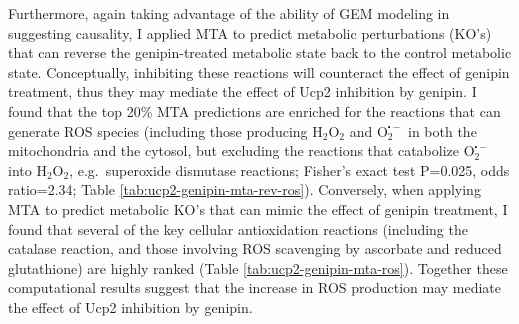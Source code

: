 \documentclass[12pt,twoside,openany,\mydriver]{thesis}  %
\begin{document}
Furthermore, again taking advantage of the ability of GEM modeling in suggesting causality, I applied MTA to predict metabolic perturbations (KO's) that can reverse the genipin-treated metabolic state back to the control metabolic state. Conceptually, inhibiting these reactions will counteract the effect of genipin treatment, thus they may mediate the effect of Ucp2 inhibition by genipin. I found that the top 20\% MTA predictions are enriched for the reactions that can generate ROS species (including those producing \(\mathrm{H_2O_2}\) and \(\mathrm{O_2^{\centerdot -}}\) in both the mitochondria and the cytosol, but excluding the reactions that catabolize \(\mathrm{O_2^{\centerdot -}}\) into \(\mathrm{H_2O_2}\), e.g.~superoxide dismutase reactions; Fisher's exact test P=0.025, odds ratio=2.34; Table \ref{tab:ucp2-genipin-mta-rev-ros}). Conversely, when applying MTA to predict metabolic KO's that can mimic the effect of genipin treatment, I found that several of the key cellular antioxidation reactions (including the catalase reaction, and those involving ROS scavenging by ascorbate and reduced glutathione) are highly ranked (Table \ref{tab:ucp2-genipin-mta-ros}). Together these computational results suggest that the increase in ROS production may mediate the effect of Ucp2 inhibition by genipin.
\begin{table}

\caption{\label{tab:ucp2-genipin-mta-rev-ros}Enrichment of top MTA predictions whose KO can reverse the effect of genipin in ROS producing reactions}
\centering
{}
\end{table}
\begin{table}

\caption{\label{tab:ucp2-genipin-mta-ros}The predicted percent rank of several cellular antioxidation reaction in the MTA prediction of reactions whose KO can mimic the effect of genipin treatment}
\centering
{}
\end{table}
\end{document}
